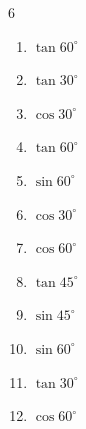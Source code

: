 \begin{multicols}{6}
\begin{enumerate}

  \item $\displaystyle \tan{60^\circ}$


  \item $\displaystyle \tan{30^\circ}$


\columnbreak %

  \item $\displaystyle \cos{30^\circ}$


  \item $\displaystyle \tan{60^\circ}$


  \item $\displaystyle \sin{60^\circ}$


  \item $\displaystyle \cos{30^\circ}$


  \item $\displaystyle \cos{60^\circ}$


  \item $\displaystyle \tan{45^\circ}$

        \phantom{$\displaystyle =1$}

  \item $\displaystyle \sin{45^\circ}$


  \item $\displaystyle \sin{60^\circ}$


  \item $\displaystyle \tan{30^\circ}$


  \item $\displaystyle \cos{60^\circ}$



\end{enumerate}
\end{multicols}

